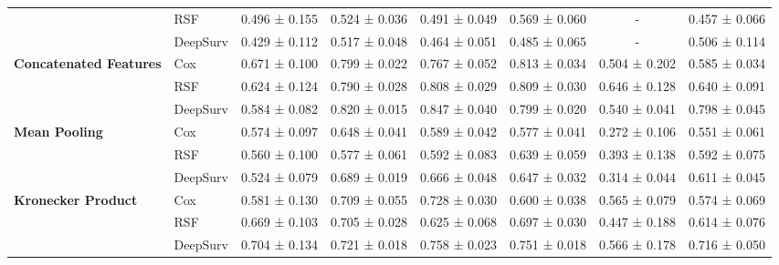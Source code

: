\begin{sidewaystable}[htbp]
\begin{tabular}{@{}llcccccc@{}}
        & RSF & 0.496 ± 0.155 & 0.524 ± 0.036 & 0.491 ± 0.049 & 0.569 ± 0.060 & - & 0.457 ± 0.066 \\
        & DeepSurv & 0.429 ± 0.112 & 0.517 ± 0.048 & 0.464 ± 0.051 & 0.485 ± 0.065 & - & 0.506 ± 0.114 \\
        \midrule
        \multirow{3}{*}{\textbf{Concatenated Features}} & Cox & 0.671 ± 0.100 & 0.799 ± 0.022 & 0.767 ± 0.052 & 0.813 ± 0.034 & 0.504 ± 0.202 & 0.585 ± 0.034 \\
        & RSF & 0.624 ± 0.124 & 0.790 ± 0.028 & 0.808 ± 0.029 & 0.809 ± 0.030 & 0.646 ± 0.128 & 0.640 ± 0.091 \\
        & DeepSurv & 0.584 ± 0.082 & 0.820 ± 0.015 & 0.847 ± 0.040 & 0.799 ± 0.020 & 0.540 ± 0.041 & 0.798 ± 0.045 \\
        \midrule
        \multirow{3}{*}{\textbf{Mean Pooling}} & Cox & 0.574 ± 0.097 & 0.648 ± 0.041 & 0.589 ± 0.042 & 0.577 ± 0.041 & 0.272 ± 0.106 & 0.551 ± 0.061 \\
        & RSF & 0.560 ± 0.100 & 0.577 ± 0.061 & 0.592 ± 0.083 & 0.639 ± 0.059 & 0.393 ± 0.138 & 0.592 ± 0.075 \\
        & DeepSurv & 0.524 ± 0.079 & 0.689 ± 0.019 & 0.666 ± 0.048 & 0.647 ± 0.032 & 0.314 ± 0.044 & 0.611 ± 0.045 \\
        \midrule
        \multirow{3}{*}{\textbf{Kronecker Product}} & Cox & 0.581 ± 0.130 & 0.709 ± 0.055 & 0.728 ± 0.030 & 0.600 ± 0.038 & 0.565 ± 0.079 & 0.574 ± 0.069 \\
        & RSF & 0.669 ± 0.103 & 0.705 ± 0.028 & 0.625 ± 0.068 & 0.697 ± 0.030 & 0.447 ± 0.188 & 0.614 ± 0.076 \\
        & DeepSurv & 0.704 ± 0.134 & 0.721 ± 0.018 & 0.758 ± 0.023 & 0.751 ± 0.018 & 0.566 ± 0.178 & 0.716 ± 0.050 \\
        \bottomrule
    \end{tabular}
\end{sidewaystable}